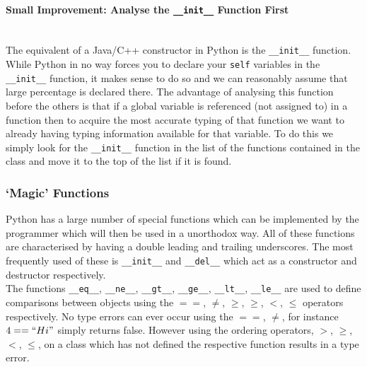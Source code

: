 \documentclass[12pt, titlepage]{article}
\begin{document}
\paragraph{Small Improvement: Analyse the \texttt{\_\_init\_\_} Function First}\mbox{}\\
The equivalent of a Java/C++ constructor in Python is the \texttt{\_\_init\_\_} function. While Python in no way forces you to declare your \texttt{self} variables in the \texttt{\_\_init\_\_} function, it makes sense to do so and we can reasonably assume that large percentage is declared there. The advantage of analysing this function before the others is that if a global variable is referenced (not assigned to) in a function then to acquire the most accurate typing of that function we want to already having typing information available for that variable. To do this we simply look for the \texttt{\_\_init\_\_} function in the list of the functions contained in the class and move it to the top of the list if it is found.

\subsubsection{`Magic' Functions}
Python has a large number of special functions which can be implemented by the programmer which will then be used in a unorthodox way. All of these functions are characterised by having a double leading and trailing underscores. The most frequently used of these is \texttt{\_\_init\_\_} and \texttt{\_\_del\_\_} which act as a constructor and destructor respectively. \\
The functions \texttt{\_\_eq\_\_}, \texttt{\_\_ne\_\_}, \texttt{\_\_gt\_\_}, \texttt{\_\_ge\_\_}, \texttt{\_\_lt\_\_}, \texttt{\_\_le\_\_} are used to define comparisons between objects using the $==$, $\neq$, $\ge$, $\geq$, $<$, $\leq$ operators respectively. No type errors can ever occur using the $==$, $\neq$, for instance $4 == ``Hi"$ simply returns false. However using the ordering operators, $>$, $\geq$, $<$, $\leq$, on a class which has not defined the respective function results in a type error.
\end{document}
